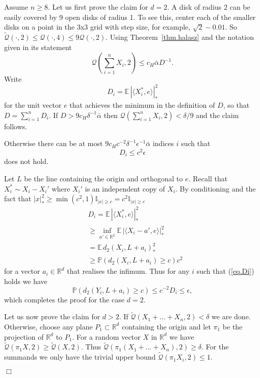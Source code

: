 \documentclass{article}
\newenvironment{proofof}[1]{\noindent {\bf Proof of #1}}{\hspace*{\fill}$\Box$}
\def\E{{\mathbb E}\,}
\newcommand{\pr}{\mathbb P}
\newcommand{\conc}{\mathcal{Q}}
\newcommand{\concdiam}{\tilde{\mathcal{Q}}}
\begin{document}
\begin{proofof}{Lemma~\ref{lem.halasz_corollary2}}
    Assume $n \ge 8$. Let us first prove the claim for $d=2$. A disk of radius $2$ can be easily covered
by 9 open disks of radius 1. 
To see this, center each of the smaller disks on a point in the 3x3 grid with step size, for example, $\sqrt{2} - 0.01$.
    So $\concdiam(\cdot, 2) \le \conc(\cdot, 4) \le 9\conc(\cdot, 2)$.
    Using Theorem~\ref{thm.halasz} and the notation given in its statement \begin{equation}\label{eq.halasz_eq}
        \conc(\sum_{i=1}^n X_i, 2) \le c_H \bar{\alpha} D^{-1}.
    \end{equation}
    Write
    \[
        D_i= \E |\langle X^*_i, e \rangle|_*^2
    \]
    for the unit vector $e$ that achieves the minimum in the definition of $D$, so that $D = \sum_{i=1}^n D_i$.
    If $D > 9 c_H \delta^{-1} \bar{\alpha}$
    then $\conc(\sum_{i=1}^n X_i, 2) < \delta / 9$ and the claim follows.

    Otherwise there can be at most 
    $9 c_H c^{-2}  \delta^{-1} \epsilon^{-1} \bar{\alpha}$
    indices $i$ such that 
    \begin{equation} \label{eq.Di}
        D_i \le c^{2} \epsilon
    \end{equation}
    does not hold.

    Let $L$ be the line containing the origin and orthogonal to $e$. 
    Recall that $X_i^* \sim X_i - X_i'$ where $X_i'$ is an independent copy of $X_i$.
    By conditioning and the fact that $|x|_*^2 \ge \min(c^2, 1) \mathbb{I}_{|x|\ge c} =  c^2 \mathbb{I}_{|x|\ge c}$
    \begin{align*}
        &D_i = \E | \langle X^*_i, e \rangle |_*^2
        \\ & \ge \inf_{a' \in \mathbb{R}^2} \E | \langle X_i - a', e \rangle|_*^2
\\ & = \E d_2(X_i, L + a_i)_*^2
        \\ & \ge \pr(d_2(X_i, L + a_i) \ge c) c^2
    \end{align*}
    for a vector $a_i \in \mathbb{R}^d$ that realises the infimum. 
    Thus for any $i$ such that (\ref{eq.Di}) holds we have
    \[
        \pr(d_2(Y_i, L + a_i) \ge c) \le c^{-2} D_i \le \epsilon,
    \]
    which completes the proof for the case $d=2$.

    Let us now prove the claim for $d > 2$. If $\concdiam(X_1+\dots+X_n,2) < \delta$ we are done.
    Otherwise, choose any plane $P_1 \subset \mathbb{R}^d$ containing the origin and let $\pi_1$ be 
    the projection of $\mathbb{R}^d$ to $P_1$.
    For a random vector $X$ in $\mathbb{R}^d$ we have $\concdiam(\pi_1 X, 2) \ge \concdiam(X, 2)$.
    Thus $\concdiam(\pi_1(X_1 + \dots + X_n), 2) \ge \delta$. For the summands
    we only have the trivial upper bound $\concdiam(\pi_1 X_i, 2) \le 1$. 


\end{proofof}
\end{document}
